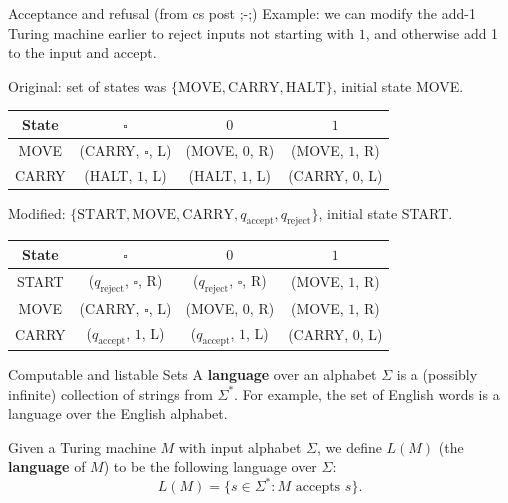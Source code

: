 \documentclass{beamer}
\begin{document}
\begin{frame}{Acceptance and refusal (from cs post ;-;)}
Example: we can modify the add-1 Turing machine earlier to reject inputs not starting with $1$, and otherwise add 1 to the input and accept.

\vspace{2mm}

Original: set of states was $\{\text{MOVE}, \text{CARRY}, \text{HALT}\}$, initial state MOVE.
\begin{center}
\begin{tabular}{c|c|c|c}
State & $\square$ & $0$ & $1$\\
\hline
MOVE & (CARRY, $\square$, L) & (MOVE, $0$, R) & (MOVE, $1$, R)\\
\hline
CARRY & (HALT, $1$, L) & (HALT, $1$, L) & (CARRY, $0$, L)\\
\end{tabular}
\end{center}

\vspace{2mm}

Modified: $\{\text{START}, \text{MOVE}, \text{CARRY}, q_\text{accept}, q_\text{reject}\}$, initial state START.
\begin{center}
\begin{tabular}{c|c|c|c}
State & $\square$ & $0$ & $1$\\
\hline
START & ($q_\text{reject}$, $\square$, R) & ($q_\text{reject}$, $\square$, R) & (MOVE, $1$, R)\\
\hline
MOVE & (CARRY, $\square$, L) & (MOVE, $0$, R) & (MOVE, $1$, R)\\
\hline
CARRY & ($q_\text{accept}$, $1$, L) & ($q_\text{accept}$, $1$, L) & (CARRY, $0$, L)\\
\end{tabular}
\end{center}
\end{frame}

\begin{frame}{Computable and listable Sets}
A \textbf{language} over an alphabet $\Sigma$ is a (possibly infinite) collection of strings from $\Sigma^*$. For example, the set of English words is a language over the English alphabet.

\vspace{2mm}

Given a Turing machine $M$ with input alphabet $\Sigma$, we define $L(M)$ (the \textbf{language} of $M$) to be the following language over $\Sigma$:
$$L(M) = \{s \in \Sigma^*: \text{$M$ accepts $s$}\}.$$
\end{frame}
\end{document}
